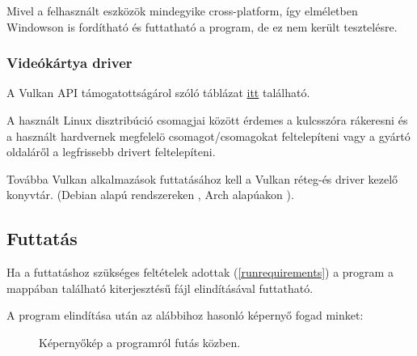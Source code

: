 Mivel a felhaszn\'alt eszk\"oz\"ok mindegyike cross-platform, \'igy elm\'eletben Windowson is ford\'ithat\'o \'es futtathat\'o a program, de ez nem ker\"ult tesztel\'esre.

\subsubsection{Vide\'ok\'artya driver}\label{gpudriver}
A Vulkan API t\'amogatotts\'ag\'arol sz\'ol\'o t\'abl\'azat \href{https://en.wikipedia.org/wiki/Vulkan_(API)\#Compatibility}{itt} tal\'alhat\'o.

A haszn\'alt Linux disztrib\'uci\'o csomagjai k\"oz\"ott \'erdemes a  kulcssz\'ora r\'akeresni \'es a haszn\'alt hardvernek megfelel\"o csomagot/csomagokat feltelep\'iteni vagy a gy\'art\'o oldal\'ar\H ol a legfrissebb drivert feltelep\'iteni.

Tov\'abba Vulkan alkalmaz\'asok futtat\'as\'ahoz kell a Vulkan r\'eteg-\'es driver kezel\H o konyvt\'ar. (Debian alap\'u rendszereken , Arch alap\'uakon ).

\subsection{Futtat\'as}
Ha a futtat\'ashoz sz\"uks\'eges felt\'etelek adottak (\ref{runrequirements}) a program a  mapp\'aban tal\'alhat\'o  kiterjeszt\'es\H u f\'ajl elind\'it\'as\'aval futtathat\'o. 

A program elind\'it\'asa ut\'an az al\'abbihoz hasonl\'o k\'eperny\H o fogad minket:
\begin{figure}[h]
	\centering
	\caption{K\'eperny\H ok\'ep a programr\'ol fut\'as k\"ozben.}
\end{figure}
